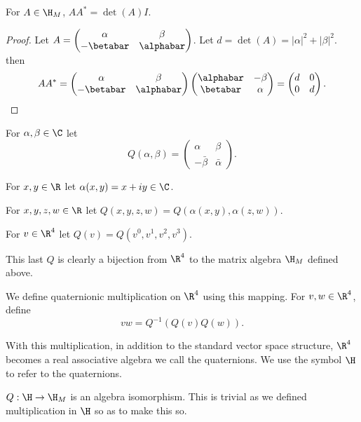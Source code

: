 \documentclass[oneside,12pt]{amsart}
\begin{document}
\begin{lemma}
\label{lemma:a_times_a_star}
For $A\in \H_M$, $AA^* = \det(A) I$.
\end{lemma}
\begin{proof}
Let $A= \begin{pmatrix}\alpha & \beta \\-\betabar & \alphabar\end{pmatrix}$.
Let $d=\det(A) = |\alpha|^2+|\beta|^2$. then
$$
AA^* = \begin{pmatrix}
\alpha & \beta \\
-\betabar & \alphabar
\end{pmatrix}
\begin{pmatrix}
\alphabar & -\beta \\
\betabar & \alpha
\end{pmatrix}
=\begin{pmatrix}d & 0\\ 0 & d\end{pmatrix}.
$$
\end{proof}


For $\alpha,\beta \in \C$ let 
$$Q(\alpha,\beta) = \begin{pmatrix}
\alpha & \beta \\
-\bar{\beta} & \bar{\alpha}
\end{pmatrix}.$$

For $x,y\in\R$ let $\alpha(x,y) = x + iy\in\C$.

For $x,y,z,w\in\R$ let $Q(x,y,z,w) = Q(\alpha(x,y), \alpha(z,w))$.

For $v\in\R^4$ let $Q(v) = Q(v^0, v^1, v^2, v^3)$.

This last $Q$ is clearly a bijection from $\R^4$ to the matrix algebra $\H_M$ defined above. 

\begin{definition}
We
define quaternionic multiplication on $\R^4$ using this mapping.
For $v,w\in\R^4$, define
$$vw = Q^{-1}(Q(v)Q(w)).$$

With this multiplication, in addition to the
standard vector space structure,
$\R^4$ becomes a real associative algebra we call the quaternions.
We use the symbol $\H$ to refer to the quaternions.
\end{definition}

\begin{remark}
$Q:\H\to \H_M$ is an algebra isomorphism. This is trivial
as we defined multiplication in $\H$ so as to make this so.
\end{remark}
\end{document}
